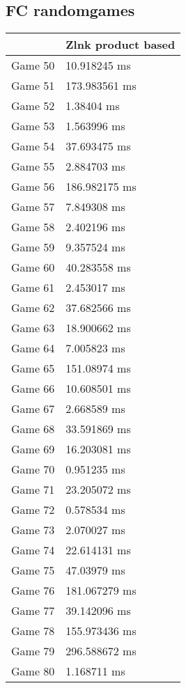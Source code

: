 \subsection{FC randomgames}
\begin{tabular}{|l|l|}
	\hline
	& Zlnk product based \\ \hline
	Game 50 & 10.918245 ms \\ \hline
	Game 51 & 173.983561 ms \\ \hline
	Game 52 & 1.38404 ms \\ \hline
	Game 53 & 1.563996 ms \\ \hline
	Game 54 & 37.693475 ms \\ \hline
	Game 55 & 2.884703 ms \\ \hline
	Game 56 & 186.982175 ms \\ \hline
	Game 57 & 7.849308 ms \\ \hline
	Game 58 & 2.402196 ms \\ \hline
	Game 59 & 9.357524 ms \\ \hline
	Game 60 & 40.283558 ms \\ \hline
	Game 61 & 2.453017 ms \\ \hline
	Game 62 & 37.682566 ms \\ \hline
	Game 63 & 18.900662 ms \\ \hline
	Game 64 & 7.005823 ms \\ \hline
	Game 65 & 151.08974 ms \\ \hline
	Game 66 & 10.608501 ms \\ \hline
	Game 67 & 2.668589 ms \\ \hline
	Game 68 & 33.591869 ms \\ \hline
	Game 69 & 16.203081 ms \\ \hline
	Game 70 & 0.951235 ms \\ \hline
	Game 71 & 23.205072 ms \\ \hline
	Game 72 & 0.578534 ms \\ \hline
	Game 73 & 2.070027 ms \\ \hline
	Game 74 & 22.614131 ms \\ \hline
	Game 75 & 47.03979 ms \\ \hline
	Game 76 & 181.067279 ms \\ \hline
	Game 77 & 39.142096 ms \\ \hline
	Game 78 & 155.973436 ms \\ \hline
	Game 79 & 296.588672 ms \\ \hline
	Game 80 & 1.168711 ms \\ \hline

\end{tabular}
